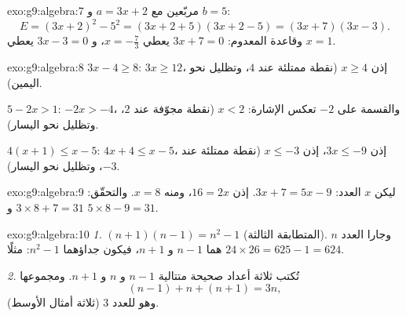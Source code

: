 \begin{solution}{exo:g9:algebra:7}
 مربّعين مع $a = 3x + 2$ و $b = 5$:
\[
E = (3x + 2)^2 - 5^2 = (3x + 2 + 5)(3x + 2 - 5) = (3x + 7)(3x - 3).
\]
وقاعدة  المعدوم: $3x + 7 = 0$ يعطي $x = -\frac73$،
و $3x - 3 = 0$ يعطي $x = 1$.
\end{solution}

\begin{solution}{exo:g9:algebra:8}
$3x - 4 \geq 8$: $3x \geq 12$، إذن $x \geq 4$ (نقطة ممتلئة عند $4$،
وتظليل نحو اليمين).

$5 - 2x > 1$: $-2x > -4$، والقسمة على $-2$ تعكس الإشارة: $x < 2$
(نقطة مجوّفة عند $2$، وتظليل نحو اليسار).

$4(x+1) \leq x - 5$: $4x + 4 \leq x - 5$، إذن $3x \leq -9$، إذن
$x \leq -3$ (نقطة ممتلئة عند $-3$، وتظليل نحو اليسار).
\end{solution}

\begin{solution}{exo:g9:algebra:9}
ليكن $x$ العدد: $3x + 7 = 5x - 9$. إذن $16 = 2x$، ومنه $x = 8$.
والتحقّق: $3 \times 8 + 7 = 31$ و $5 \times 8 - 9 = 31$.
\end{solution}

\begin{solution}{exo:g9:algebra:10}
\emph{1.} $(n+1)(n-1) = n^2 - 1$ (المتطابقة الثالثة). وجارا العدد
$n$ هما $n - 1$ و $n + 1$، فيكون جداؤهما $n^2 - 1$: مثلًا
$24 \times 26 = 625 - 1 = 624$.

\emph{2.} تُكتب ثلاثة أعداد صحيحة متتالية $n - 1$ و $n$
و $n + 1$. ومجموعها
\[
(n-1) + n + (n+1) = 3n ,
\]
وهو  للعدد $3$ (ثلاثة أمثال الأوسط).
\end{solution}

